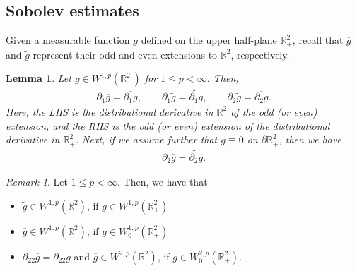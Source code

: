 \documentclass[10pt]{amsart}
\newtheorem{lemma}[theorem]{Lemma}
\theoremstyle{definition}
\theoremstyle{remark}
\newtheorem{remark}[theorem]{Remark}
\numberwithin{equation}{section}
\newcommand{\rd}{\partial}
\newcommand{\0}{\emptyset}
\newcommand{\bbR}{\mathbb R}
\begin{document}
	
	\subsection{Sobolev estimates}
	Given a measurable function $g$ defined on the upper half-plane $\bbR^{2}_{+}$, recall that $\overline{g}$ and $\widetilde{g}$ represent their odd and even extensions to $\bbR^{2}$, respectively. 
	
	\begin{lemma}\label{lem:interchange}
		Let $g \in W^{1,p}(\bbR^{2}_{+})$ for $1 \leq p < \infty$. Then, \begin{equation*}
			\begin{split}
				\rd_{1}\overline{g} = \overline{ \rd_{1}g }, \qquad \rd_{1}\widetilde{g} = \widetilde{ \rd_{1}g }, \qquad \rd_{2} \widetilde{g} = \overline{\rd_{2}g}. 
			\end{split}
		\end{equation*} Here, the LHS is the distributional derivative in $\bbR^{2}$ of the odd (or even) extension, and the RHS is the odd (or even) extension of the distributional derivative in $\bbR^2_{+}$. Next, if we assume further that $g \equiv 0$ on $\partial\bbR^{2}_{+}$, then we have \begin{equation*}
			\begin{split}
				\rd_{2} \overline{g} = \widetilde{\rd_{2}g}. 
			\end{split}
		\end{equation*}
	\end{lemma}
	\begin{remark}\label{rmk:W1p-extension}
		Let $1 \leq p < \infty$. Then, we have that \begin{itemize}
			\item $\widetilde{g}\in W^{1,p}(\bbR^{2})$, if $g \in W^{1,p}(\bbR^{2}_{+})$
			\item  $\overline{g}\in W^{1,p}(\bbR^{2})$, if $g \in W^{1,p}_{0}(\bbR^{2}_{+})$ 
			\item $\rd_{22}\overline{g} = \overline{\rd_{22}g}$ and $\overline{g} \in W^{2,p}(\bbR^2)$, if $g \in W^{2,p}_{0}(\bbR^{2}_{+})$. 
		\end{itemize}
	\end{remark}
\end{document}
